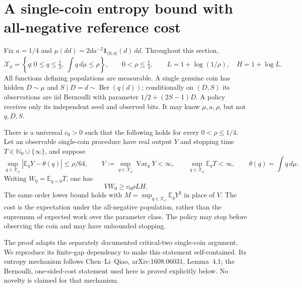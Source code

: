 \section{A single-coin entropy bound with all-negative reference cost}

Fix $a=1/4$ and $\mu(dd)=2d a^{-2}\mathbf1_{(0,a]}(d)\,dd$.
Throughout this section,
\[
 \mathcal X_\rho=\left\{q:0\le q\le\tfrac12,
                    \ \int q\,d\mu\le\rho\right\},
 \qquad 0<\rho\le\tfrac14,
 \qquad L=1+\log(1/\rho),\quad H=1+\log L.
\]
All functions defining populations are measurable. A single genuine coin
has hidden $D\sim\mu$ and $S\mid D=d\sim\operatorname{Ber}(q(d))$;
conditionally on $(D,S)$ its observations are iid Bernoulli with parameter
$1/2+(2S-1)D$. A policy receives only its independent seed and observed
bits. It may know $\mu,a,\rho$, but not $q,D,S$.

\begin{theorem}
\label{thm:base-cost}
There is a universal $c_0>0$ such that the following holds for every
$0<\rho\le1/4$. Let an observable single-coin procedure have real output
$Y$ and stopping time $T\in\mathbb N_0\cup\{\infty\}$, and suppose
\[
 \sup_{q\in\mathcal X_\rho}|\mathbb E_qY-\theta(q)|\le\rho/64,
 \qquad
 V:=\sup_{q\in\mathcal X_\rho}\operatorname{Var}_qY<\infty,
 \qquad
 \sup_{q\in\mathcal X_\rho}\mathbb E_qT<\infty,
 \qquad \theta(q)=\int q\,d\mu.
\]
Writing $W_0=\mathbb E_{q=0}T$, one has
\[
                 V W_0\ge c_0\rho L H.                 \tag{BC1}
\]
The same order lower bound holds with
$M=\sup_{q\in\mathcal X_\rho}\mathbb E_qY^2$ in place of $V$.
The cost is the expectation under the all-negative population, rather
than the supremum of expected work over the parameter class. The policy
may stop before observing the coin and may have unbounded stopping.
\end{theorem}

The proof adapts the separately documented critical-two single-coin
argument. We reproduce its finite-gap dependency to make this statement
self-contained. Its entropy mechanism follows Chen--Li--Qiao,
arXiv:1608.06031, Lemma~4.1; the Bernoulli, one-sided-cost statement used
here is proved explicitly below. No novelty is claimed for that mechanism.


